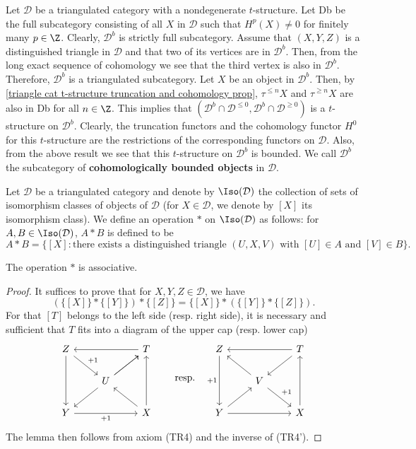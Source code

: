 Let $\mathcal{D}$ be a triangulated category with a nondegenerate $t$-structure. Let Db be the full subcategory consisting of all $X$ in $\mathcal{D}$ such that $H^p(X)\neq 0$ for finitely many $p\in\Z$. Clearly, $\mathcal{D}^b$ is strictly full subcategory. Assume that $(X,Y,Z)$ is a distinguished triangle in $\mathcal{D}$ and that two of its vertices are in $\mathcal{D}^b$. Then, from the long exact sequence of cohomology we see that the third vertex is also in $\mathcal{D}^b$. Therefore, $\mathcal{D}^b$ is a triangulated subcategory. Let $X$ be an object in $\mathcal{D}^b$. Then, by \cref{triangle cat t-structure truncation and cohomology prop}, $\tau^{\leq n}X$ and $\tau^{\geq n}X$ are also in Db for all $n\in\Z$. This implies that $(\mathcal{D}^b\cap\mathcal{D}^{\leq 0},\mathcal{D}^b\cap\mathcal{D}^{\geq 0})$ is a $t$-structure on $\mathcal{D}^b$. Clearly, the truncation functors and the cohomology functor $H^0$ for this $t$-structure are the restrictions of the corresponding functors on $\mathcal{D}$. Also, from the above result we see that this $t$-structure on $\mathcal{D}^b$ is bounded. We call $\mathcal{D}^b$ the subcategory of \textbf{cohomologically bounded objects} in $\mathcal{D}$.\par

Let $\mathcal{D}$ be a triangulated category and denote by $\Iso(\mathcal{D})$ the collection of sets of isomorphism classes of objects of $\mathcal{D}$ (for $X\in\mathcal{D}$, we denote by $[X]$ its isomorphism class). We define an operation $\ast$ on $\Iso(\mathcal{D})$ as follows: for $A,B\in\Iso(\mathcal{D})$, $A\ast B$ is defined to be 
\[A\ast B=\{[X]:\text{there exists a distinguished triangle $(U,X,V)$ with $[U]\in A$ and $[V]\in B$}\}.\]

\begin{lemma}\label{triangle cat extension operator associative}
The operation $\ast$ is associative.
\end{lemma}
\begin{proof}
It suffices to prove that for $X,Y,Z\in\mathcal{D}$, we have
\[(\{[X]\}\ast\{[Y]\})\ast\{[Z]\}=\{[X]\}\ast(\{[Y]\}\ast\{[Z]\}).\]
For that $[T]$ belongs to the left side (resp. right side), it is necessary and sufficient that $T$ fits into a diagram of the upper cap (resp. lower cap)
\[\begin{tikzcd}
Z\ar[rd,"+1"]\ar[dd]&&T\ar[ll]\\
&U\ar[ld]\ar[ru]\ar[ru]&\\
Y\ar[rr,swap,"+1"]&&X\ar[lu]\ar[uu]
\end{tikzcd}\quad\quad\text{resp.}\quad
\begin{tikzcd}
Z\ar[dd,swap,"+1"]&&T\ar[ll]\ar[ld]\\
&V\ar[rd,"+1"]\ar[lu]&\\
Y\ar[rr]\ar[ru]&&X\ar[uu]
\end{tikzcd}\]
The lemma then follows from axiom (TR4) and the inverse of (TR4').
\end{proof}

